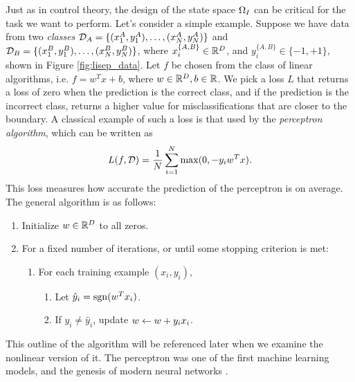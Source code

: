 Just as in control theory, the design of the state space $\Omega_I$ can be critical for the task we want to perform. Let's consider a simple
example. Suppose we have data from two \emph{classes} $\mathcal{D}_A = \{(x_1^A, y_1^A), \dots, (x_N^A, y_N^A)\}$ and 
$\mathcal{D}_B = \{(x_1^B, y_1^B), \dots, (x_N^B, y_N^B)\}$, where $x_i^{\{A,B\}}\in\mathbb{R}^D$, and $y_i^{\{A,B\}}\in\{-1,+1\}$, shown
in Figure \ref{fig:lisep_data}. Let $f$ be chosen from the class of linear algorithms, i.e. $f = w^Tx + b$, where $w\in\mathbb{R}^D, b\in\mathbb{R}$. 
We pick a loss $L$ that returns a loss of zero when the prediction is the correct class, and if the prediction is the incorrect class,
returns a higher value for misclassifications that are closer to the boundary. A classical example of such a loss is that used by
the \emph{perceptron algorithm}, which can be written as 
\begin{align}\eqlabel{perc_loss}
 L(f, \sampSetClass) = \frac{1}{\nsamp}\sum_{i=1}^N\max(0, -y_iw^Tx). 
\end{align}
This loss measures how accurate the prediction of the perceptron is on average. The general algorithm is as follows:
\begin{enumerate}
 \item Initialize $w\in\mathbb{R}^D$ to all zeros. 
 \item For a fixed number of iterations, or until some stopping criterion is met:
       \begin{enumerate}
        \item For each training example $(x_i, y_i)$,
              \begin{enumerate}
               \item Let $\hat{y}_i=\mathrm{sgn}(w^Tx_i)$.
               \item If $y_i\neq\hat{y}_i$, update $w \leftarrow w + y_ix_i$.
              \end{enumerate}
       \end{enumerate}
\end{enumerate}
This outline of the algorithm will be referenced later when we examine the nonlinear version of it.
The perceptron was one of the first machine learning models, and the genesis of modern neural networks \cite{rosenblatt1958perceptron}. 


